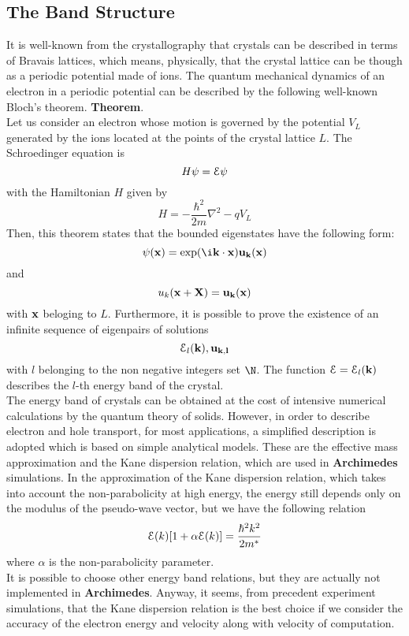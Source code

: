 \documentclass[12pt]{book}
\begin{document}
\subsection{The Band Structure}
It is well-known from the crystallography that crystals can be described in terms of Bravais lattices, which means, physically, that the crystal lattice can be though as a periodic potential made of ions. The quantum mechanical dynamics of an electron in a periodic potential can be described by the following well-known Bloch's theorem.
\textbf{Theorem}.\\ 
Let us consider an electron whose motion is governed by the potential $V_L$ generated by the ions located at the points of the crystal lattice $L$. The Schroedinger equation is
\begin{equation}
 H \psi = {\cal{E}} \psi
\end{equation}
with the Hamiltonian $H$ given by
$$ H = - \frac{\hbar^2}{2 m} \nabla^2 - q V_L $$
Then, this theorem states that the bounded eigenstates have the following form:
\begin{equation}
 \psi(\bf{x}) = \exp(\i \bf{k} \cdot \bf{x}) u_k(\bf{x})
\end{equation}
and
\begin{equation}
 u_k(\bf{x} + \bf{X}) = u_k(\bf{x}) 
\end{equation}
with $\bf{x}$ beloging to $L$.
Furthermore, it is possible to prove the existence of an infinite sequence of eigenpairs of solutions
$$ {\cal{E}}_l(\bf{k}), u_{k,l} $$
with $l$ belonging to the non negative integers set $\N$. The function ${\cal{E}}={\cal{E}}_l({\bf{k}})$ describes the $l$-th energy band of the crystal.
\\
The energy band of crystals can be obtained at the cost of intensive numerical calculations by the quantum theory of solids. However, in order to describe electron and hole transport, for most applications, a simplified description is adopted which is based on simple analytical models. These are the effective mass approximation and the Kane dispersion relation, which are used in \textbf{Archimedes} simulations. In the approximation of the Kane dispersion relation, which takes into account the non-parabolicity at high energy, the energy still depends only on the modulus of the pseudo-wave vector, but we have the following relation
\begin{equation}
 {\cal{E}}(k)[1+ \alpha {\cal{E}}(k)] = \frac{\hbar^2 k^2}{2 m^*} 
\end{equation}
where $\alpha$ is the non-parabolicity parameter.
\\
It is possible to choose other energy band relations, but they are actually not implemented in \textbf{Archimedes}. Anyway, it seems, from precedent experiment simulations, that the Kane dispersion relation is the best choice if we consider the accuracy of the electron energy and velocity along with velocity of computation.
 
\end{document}
